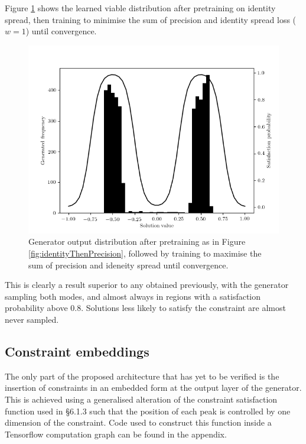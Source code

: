 \documentclass[../../main.tex]{subfiles}
\begin{document}
Figure \ref{fig:identityAndPrecision} shows the learned viable distribution after pretraining on identity spread, then training to minimise the sum of precision and identity spread loss ($w=1$) until convergence.
\begin{figure}[H]
    \begin{center}
    \includegraphics[width=\textwidth]{identityAndPrecision}
    \caption{
        Generator output distribution after pretraining as in Figure \ref{fig:identityThenPrecision}, followed by training to maximise the sum of precision and ideneity spread until convergence.
    }
    \label{fig:identityAndPrecision}
    \end{center}
\end{figure}
This is clearly a result superior to any obtained previously, with the generator sampling both modes, and almost always in regions with a satisfaction probability above $0.8$.
Solutions less likely to satisfy the constraint are almost never sampled.

\subsection{Constraint embeddings}

The only part of the proposed architecture that has yet to be verified is the insertion of constraints in an embedded form at the output layer of the generator.
This is achieved using a generalised alteration of the constraint satisfaction function used in \S 6.1.3 such that the position of each peak is controlled by one dimension of the constraint.
Code used to construct this function inside a Tensorflow computation graph can be found in the appendix.
\end{document}

